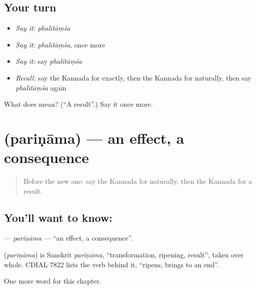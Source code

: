 \subsection*{Your turn}
\begin{itemize}
\raggedright
  \item \emph{Say it:} \emph{phalitāṃśa}
  \item \emph{Say it:} \emph{phalitāṃśa}, once more
  \item \emph{Say it:} say \emph{phalitāṃśa}
  \item \emph{Recall:} say the Kannada for exactly, then the Kannada for naturally, then say \emph{phalitāṃśa} again
\end{itemize}

\begin{tcolorbox}[breakable,colback=teal!4,colframe=teal!35!black,title={Before you move on}]
What does  mean? (\textquotedblleft{}A result\textquotedblright{}.) Say it once more.
\end{tcolorbox}
\section[\texorpdfstring{\kn{ಪರಿಣಾಮ} (pariṇāma)}{ಪರಿಣಾಮ (pariṇāma)}]{ (pariṇāma) — an effect, a consequence}

\label{lesson:KA-C177-parinama}



\begin{quote}
Before the new one: say the Kannada for naturally, then the Kannada for a result.
\end{quote}

\subsection*{You'll want to know: }
\textbf{} — \emph{pariṇāma} — \textquotedblleft{}an effect, a consequence\textquotedblright{}.

\begin{cousinweb}
\textbf{} (\emph{pariṇāma}) is Sanskrit \emph{pariṇāma}, \textquotedblleft{}transformation, ripening, result\textquotedblright{}, taken over whole. CDIAL 7822 lists the verb behind it, \textquotedblleft{}ripens, brings to an end\textquotedblright{}.
\end{cousinweb}

\begin{grammarlens}[title={What you've built}]
One more word for this chapter.
\end{grammarlens}

